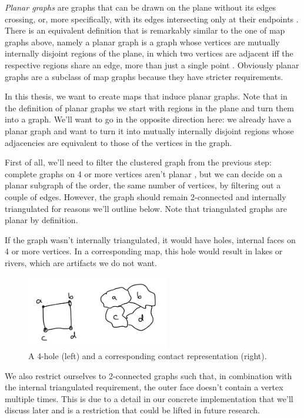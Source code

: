 \emph{Planar graphs} are graphs that can be drawn on the plane without its edges crossing, or, more specifically, with its edges intersecting only at their endpoints \cite{wagner2016algorithmen}. There is an equivalent definition that is remarkably similar to the one of map graphs above, namely a planar graph is a graph whose vertices are mutually internally disjoint regions of the plane, in which two vertices are adjacent iff the respective regions share an edge, \ie{} more than just a single point \cite{chen2002map}. Obviously planar graphs are a subclass of map graphs because they have stricter requirements.

In this thesis, we want to create maps that induce planar graphs. Note that in the definition of  planar graphs we start with regions in the plane and turn them into a graph. We'll want to go in the opposite direction here: we already have a planar graph and want to turn it into mutually internally disjoint regions whose adjacencies are equivalent to those of the vertices in the graph.

First of all, we'll need to filter the clustered graph from the previous step: complete graphs on 4 or more vertices aren't planar \cite{wagner2016algorithmen}, but we can decide on a planar subgraph of the order, \ie{} the same number of vertices, by filtering out a couple of edges. However, the graph should remain 2-connected and internally triangulated for reasons we'll outline below. Note that triangulated graphs are planar by definition.

If the graph wasn't internally triangulated, it would have holes, \ie{} internal faces on 4 or more vertices. In a corresponding map, this hole would result in lakes or rivers, which are artifacts we do not want.

\begin{figure}[H]
	\centering\includegraphics[height=120px]{Resources/Filtering-Hole.png}
	\caption{A 4-hole (left) and a corresponding contact representation (right).}
	\label{fig:filtering-holes}
\end{figure}

We also restrict ourselves to 2-connected graphs such that, in combination with the internal triangulated requirement, the outer face doesn't contain a vertex multiple times. This is due to a detail in our concrete implementation that we'll discuss later and is a restriction that could be lifted in future research.

